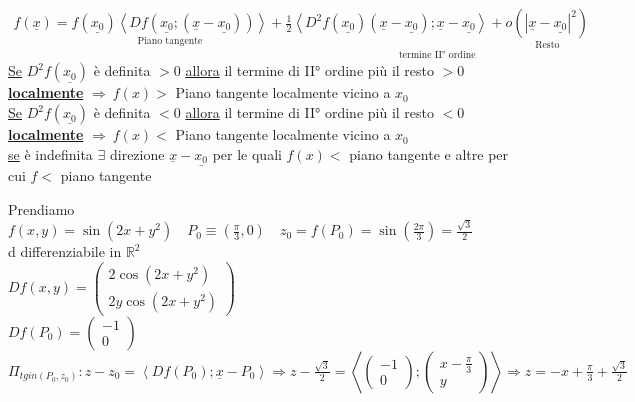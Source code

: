 \documentclass[a4paper, oneside]{article}
\begin{document}
        \begin{proposition}
            \begin{gather*}
                f(\underline{x}) = \underset{\text{Piano tangente}}{f(\underline{x_0}) \left\langle Df(\underline{x_0};(\underline{x} - \underline{x_0})) \right\rangle} + \underset{\text{termine II° ordine}}{\frac{1}{2} \left\langle D^2 f(\underline{x_0})(\underline{x}- \underline{x_0}); \underline{x}- \underline{x_0}\right\rangle  + \underset{\text{Resto}}{o(| \underline{x}- \underline{x_0} |^2)}}
            \end{gather*}
            \underline{Se} $D^2f(\underline{x_0})$ è definita $> 0$ \underline{allora} il termine di II° ordine più il resto $>0$ \underline{\textbf{localmente}} $\Rightarrow \ f(x) > $ Piano tangente localmente vicino a $x_0$\\
            \underline{Se} $D^2f(\underline{x_0})$ è definita $< 0$ \underline{allora} il termine di II° ordine più il resto $<0$ \underline{\textbf{localmente}} $\Rightarrow \ f(x) < $ Piano tangente localmente vicino a $x_0$\\ 
            \underline{se} è indefinita $\exists $ direzione $\underline{x} - \underline{x_0}$ per le quali $f(x) < $ piano tangente e altre per cui $f < $ piano tangente\\
        \end{proposition}
        \begin{example}
            Prendiamo $f(x,y) = \sin(2x+y^2) \quad P_0 \equiv (\frac{\pi}{3}, 0) \quad z_0 = f(P_0) = \sin (\frac{2\pi}{3}) = \frac{\sqrt{3}}{2}$\\
            d differenziabile in $\mathbb{R}^2$\\
            $Df(x,y) = \begin{pmatrix}
                2 \cos(2x + y^2)\\
                2y \cos(2x + y^2)
            \end{pmatrix}$\\
            $Df(P_0) = \begin{pmatrix}
                -1 \\ 0
            \end{pmatrix}$\\
            $\Pi_{tg in(P_0,z_0)}: z-z_0 = \left\langle Df(P_0); \underline{x} - P_0 \right\rangle \Rightarrow z -\frac{\sqrt{3}}{2} = \left\langle \begin{pmatrix} -1 \\ 0 \end{pmatrix}; \begin{pmatrix} x- \frac{\pi}{3} \\ y \end{pmatrix} \right\rangle  \Rightarrow z = -x +\frac{\pi}{3} + \frac{\sqrt{3}}{2}$ \\ 
        \end{example}
\end{document}
